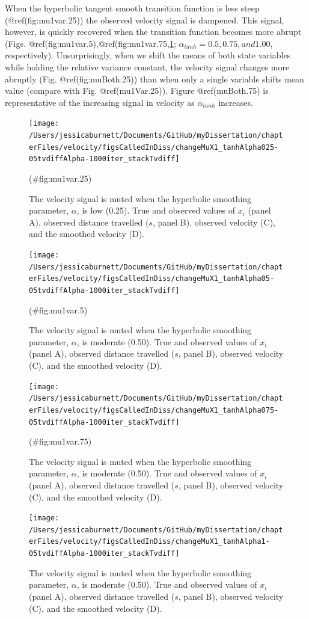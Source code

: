 \documentclass[12pt,twoside,openany]{reedthesis}
\begin{document}
When the hyperbolic tangent smooth transition function is less steep (@ref(fig:mu1var.25)) the observed velocity signal is dampened. This signal, however, is quickly recovered when the transition function becomes more abrupt (Figs. @ref(fig:mu1var.5),@ref(fig:mu1var.75,\ref{fig:mu1var1}; \(\alpha_{tanh}=0.5, 0.75, and 1.00\), respectively). Unsurprisingly, when we shift the means of both state variables while holding the relative variance constant, the velocity signal changes more abruptly (Fig. @ref(fig:muBoth.25)) than when only a single variable shifts mean value (compare with Fig. @ref(mu1Var.25)). Figure @ref(muBoth.75) is representative of the increasing signal in velocity as \(\alpha_{tanh}\) increases.
\begin{figure}
\texttt{[image: /Users/jessicaburnett/Documents/GitHub/myDissertation/chapterFiles/velocity/figsCalledInDiss/changeMuX1\_tanhAlpha025-05tvdiffAlpha-1000iter\_stackTvdiff]} \caption{The velocity signal is muted when the  hyperbolic smoothing parameter, $\alpha$, is low (0.25). True and observed values of $x_i$ (panel A), observed distance travelled ($s$, panel B), observed velocity (C), and the smoothed velocity (D). }(\#fig:mu1var.25)
\end{figure}
\begin{figure}
\texttt{[image: /Users/jessicaburnett/Documents/GitHub/myDissertation/chapterFiles/velocity/figsCalledInDiss/changeMuX1\_tanhAlpha05-05tvdiffAlpha-1000iter\_stackTvdiff]} \caption{The velocity signal is muted when the  hyperbolic smoothing parameter, $\alpha$, is moderate (0.50). True and observed values of $x_i$ (panel A), observed distance travelled ($s$, panel B), observed velocity (C), and the smoothed velocity (D). }(\#fig:mu1var.5)
\end{figure}
\begin{figure}
\texttt{[image: /Users/jessicaburnett/Documents/GitHub/myDissertation/chapterFiles/velocity/figsCalledInDiss/changeMuX1\_tanhAlpha075-05tvdiffAlpha-1000iter\_stackTvdiff]} \caption{The velocity signal is muted when the  hyperbolic smoothing parameter, $\alpha$, is moderate (0.50). True and observed values of $x_i$ (panel A), observed distance travelled ($s$, panel B), observed velocity (C), and the smoothed velocity (D). }(\#fig:mu1var.75)
\end{figure}
\begin{figure}
\texttt{[image: /Users/jessicaburnett/Documents/GitHub/myDissertation/chapterFiles/velocity/figsCalledInDiss/changeMuX1\_tanhAlpha1-05tvdiffAlpha-1000iter\_stackTvdiff]} \caption{The velocity signal is muted when the  hyperbolic smoothing parameter, $\alpha$, is moderate (0.50). True and observed values of $x_i$ (panel A), observed distance travelled ($s$, panel B), observed velocity (C), and the smoothed velocity (D). }\label{fig:mu1var1}
\end{figure}
\end{document}
